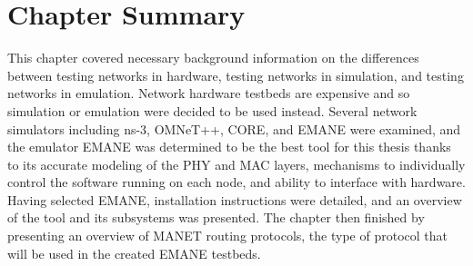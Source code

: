 \section{Chapter Summary}
This chapter covered necessary background information on the differences between testing networks in hardware, testing networks in simulation, and testing networks in emulation.
Network hardware testbeds are expensive and so simulation or emulation were decided to be used instead.
Several network simulators including ns-3, OMNeT++, CORE, and EMANE were examined, and the emulator EMANE was determined to be the best tool for this thesis thanks to its accurate modeling of the PHY and MAC layers, mechanisms to individually control the software running on each node, and ability to interface with hardware.
Having selected EMANE, installation instructions were detailed, and an overview of the tool and its subsystems was presented.
The chapter then finished by presenting an overview of MANET routing protocols, the type of protocol that will be used in the created EMANE testbeds.